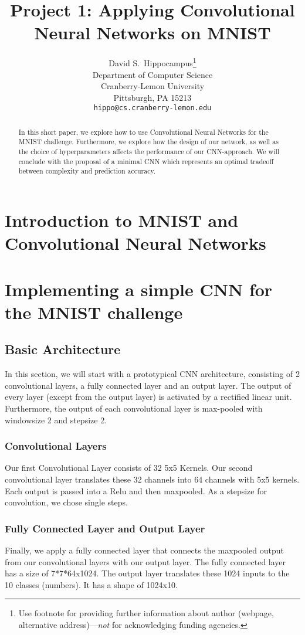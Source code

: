 \documentclass{article}
\title{Project 1: Applying Convolutional Neural Networks on MNIST}
\author{
  David S.~Hippocampus\thanks{Use footnote for providing further
    information about author (webpage, alternative
    address)---\emph{not} for acknowledging funding agencies.} \\
  Department of Computer Science\\
  Cranberry-Lemon University\\
  Pittsburgh, PA 15213 \\
  \texttt{hippo@cs.cranberry-lemon.edu} \\
}
\begin{document}

\maketitle

\begin{abstract}
  In this short paper, we explore how to use Convolutional Neural Networks for the MNIST challenge. Furthermore, we explore how the design of our network, as well as the choice of hyperparameters affects the performance of our CNN-approach. We will conclude with the proposal of a minimal CNN which represents an optimal tradeoff between complexity and prediction accuracy.
\end{abstract}

\section{Introduction to MNIST and Convolutional Neural Networks}

\section{Implementing a simple CNN for the MNIST challenge}
\subsection{Basic Architecture}
In this section, we will start with a prototypical CNN architecture, consisting of 2 convolutional layers, a fully connected layer and an output layer. The output of every layer (except from the output layer) is activated by a rectified linear unit. Furthermore, the output of each convolutional layer is max-pooled with windowsize 2 and stepsize 2. 

\subsubsection*{Convolutional Layers}
Our first Convolutional Layer consists of 32 5x5 Kernels. Our second convolutional layer translates these 32 channels into 64 channels with 5x5 kernels. Each output is passed into a Relu and then maxpooled. As a stepsize for convolution, we chose single steps.

\subsubsection*{Fully Connected Layer and Output Layer}
Finally, we apply a fully connected layer that connects the maxpooled output from our convolutional layers with our output layer. The fully connected layer has a size of 7*7*64x1024. The output layer translates these 1024 inputs to the 10 classes (numbers). It has a shape of 1024x10.
\end{document}
